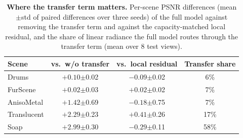 \begin{table}[t]
\caption{\textbf{Where the transfer term matters.} Per-scene PSNR differences (mean$\pm$std of paired differences over three seeds) of the full model against removing the transfer term and against the capacity-matched local residual, and the share of linear radiance the full model routes through the transfer term (mean over 8 test views).}
\label{tab:paired}
\centering\small
\setlength{\tabcolsep}{4pt}
\begin{tabular}{@{}lccc@{}}
\toprule
Scene & vs.\ w/o transfer & vs.\ local residual & Transfer share \\
\midrule
Drums & $+0.10${\tiny$\pm$0.02} & $-0.09${\tiny$\pm$0.02} & 6\% \\
FurScene & $+0.02${\tiny$\pm$0.03} & $+0.02${\tiny$\pm$0.02} & 7\% \\
AnisoMetal & $+1.42${\tiny$\pm$0.69} & $-0.18${\tiny$\pm$0.75} & 7\% \\
Translucent & $+2.29${\tiny$\pm$0.23} & $+0.41${\tiny$\pm$0.26} & 17\% \\
Soap & $+2.99${\tiny$\pm$0.30} & $-0.29${\tiny$\pm$0.11} & 58\% \\
\bottomrule
\end{tabular}
\end{table}
